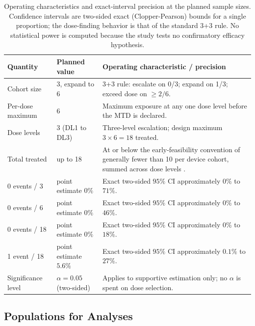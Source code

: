 \begin{table}[htbp]
\centering
\footnotesize
\caption{Operating characteristics and exact-interval precision at the planned
sample sizes. Confidence intervals are two-sided exact (Clopper-Pearson) bounds
for a single proportion; the dose-finding behavior is that of the standard 3+3
rule. No statistical power is computed because the study tests no confirmatory
efficacy hypothesis.}
\label{tab:opchar}
\begin{tabularx}{\textwidth}{L{2.0cm} L{2.6cm} Y}
\toprule
\textbf{Quantity} & \textbf{Planned value} & \textbf{Operating characteristic / precision} \\
\midrule
Cohort size & 3, expand to 6 & 3+3 rule: escalate on 0/3; expand on 1/3; exceed dose on $\geq 2/6$. \\
Per-dose maximum & 6 & Maximum exposure at any one dose level before the MTD is declared. \\
Dose levels & 3 (DL1 to DL3) & Three-level escalation; design maximum $3 \times 6 = 18$ treated. \\
Total treated & up to 18 & At or below the early-feasibility convention of generally fewer than 10 per device cohort, summed across dose levels \cite{fda2013earlyfeasibility}. \\
0 events / 3 & point estimate $0\%$ & Exact two-sided $95\%$ CI approximately $0\%$ to $71\%$. \\
0 events / 6 & point estimate $0\%$ & Exact two-sided $95\%$ CI approximately $0\%$ to $46\%$. \\
0 events / 18 & point estimate $0\%$ & Exact two-sided $95\%$ CI approximately $0\%$ to $18\%$. \\
1 event / 18 & point estimate $5.6\%$ & Exact two-sided $95\%$ CI approximately $0.1\%$ to $27\%$. \\
Significance level & $\alpha = 0.05$ (two-sided) & Applies to supportive estimation only; no $\alpha$ is spent on dose selection. \\
\bottomrule
\end{tabularx}
\end{table}

\subsection{Populations for Analyses}

